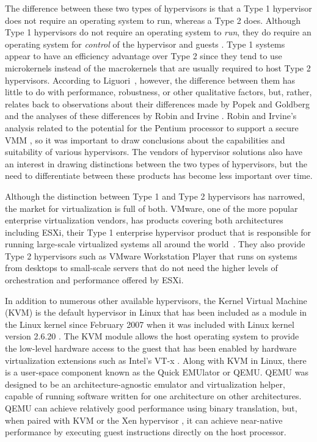 The difference between these two types of hypervisors is that a Type 1 hypervisor does not require an operating system to run, whereas a Type 2 does.
Although Type 1 hypervisors do not require an operating system to \emph{run}, they do require an operating system for \emph{control} of the hypervisor and guests \autocite{liguoriMyth}.
Type 1 systems appear to have an efficiency advantage over Type 2 since they tend to use microkernels instead of the macrokernels that are usually required to host Type 2 hypervisors.
According to Liguori~\autocite{liguoriMyth}, however, the difference between them has little to do with performance, robustness, or other qualitative factors, but, rather, relates back to  observations about their differences made by Popek and Goldberg \autocite{popek1974formal} and the analyses of these differences by Robin and Irvine \autocite{_robin_1}.
Robin and Irvine's analysis related to the potential for the Pentium processor to support a secure VMM \autocite{_robin_1}, so it was important to draw conclusions about the capabilities and suitability of various hypervisors.
The vendors of hypervisor solutions also have an interest in drawing distinctions between the two types of hypervisors, but the need to differentiate between these products has become less important over time.  

Although the distinction between Type 1 and Type 2 hypervisors has narrowed, the market for virtualization is full of both.
VMware, one of the more popular enterprise virtualization vendors, has products covering both architectures including ESXi, their Type 1 enterprise hypervisor product that is responsible for running large-scale virtualized systems all around the world~\autocite{vmwareProducts}.
They also provide Type 2 hypervisors such as VMware Workstation Player that runs on systems from desktops to small-scale servers that do not need the higher levels of orchestration and performance offered by ESXi.

In addition to numerous other available hypervisors, the Kernel Virtual Machine (KVM) is the default hypervisor in Linux that has been included as a module in the Linux kernel since February 2007 when it was included with Linux kernel version 2.6.20 \autocite{_kvm_1}.
The KVM module allows the host operating system to provide the low-level hardware access to the guest that has been enabled by hardware virtualization extensions such as Intel's VT-x \autocite{_grinberg_1}.
Along with KVM in Linux, there is a user-space component known as the Quick EMUlator or QEMU\autocite{_qemu_1}.
QEMU was designed to be an architecture-agnostic emulator and virtualization helper, capable of running software written for one architecture on other architectures.
QEMU can achieve relatively good performance using binary translation, but, when paired with KVM or the Xen hypervisor \autocite{_barham_1}, it can achieve near-native performance by executing guest instructions directly on the host processor.

